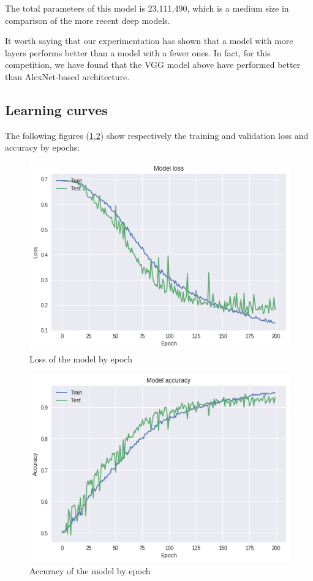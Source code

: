 \documentclass[a4paper]{article}
\begin{document}
The total parameters of this model is 23,111,490, which is a medium size in comparison of the more recent deep models.

It worth saying that our experimentation has shown that a model with more layers performs better than a model with a fewer ones. In fact, for this competition, we have found that the VGG model above have performed better than AlexNet-based architecture.

\subsection{Learning curves}
The following figures (\ref{fig:vggloss},\ref{fig:vggacc}) show respectively the training and validation loss and accuracy by epochs:

\begin{figure}[h!]
	\centering
	\includegraphics[scale=.6]{VGGLoss_of.png}
	\caption{Loss of the model by epoch}
	\label{fig:vggloss}
\end{figure}

\begin{figure}[h!]
	\centering
	\includegraphics[scale=.6]{VGGAccu_of.png}
	\caption{Accuracy of the model by epoch}
	\label{fig:vggacc}
\end{figure}
\end{document}
